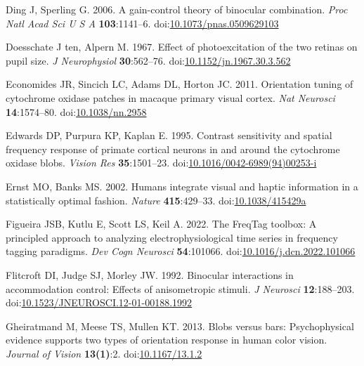 \documentclass[
]{article}
\newlength{\cslhangindent}
\newlength{\cslentryspacingunit} %
\newenvironment{CSLReferences}[2] %
 {%
  \setlength{\parindent}{0pt}
  \ifodd #1
  \let\oldpar\par
  \def\par{\hangindent=\cslhangindent\oldpar}
  \fi
  \setlength{\parskip}{#2\cslentryspacingunit}
 }%
 {}
\begin{document}
\begin{CSLReferences}{1}{0}
\leavevmode{}%
Ding J, Sperling G. 2006. A gain-control theory of binocular combination. \emph{Proc Natl Acad Sci U S A} \textbf{103}:1141--6. doi:\href{https://doi.org/10.1073/pnas.0509629103}{10.1073/pnas.0509629103}

\leavevmode{}%
Doesschate J ten, Alpern M. 1967. Effect of photoexcitation of the two retinas on pupil size. \emph{J Neurophysiol} \textbf{30}:562--76. doi:\href{https://doi.org/10.1152/jn.1967.30.3.562}{10.1152/jn.1967.30.3.562}

\leavevmode{}%
Economides JR, Sincich LC, Adams DL, Horton JC. 2011. Orientation tuning of cytochrome oxidase patches in macaque primary visual cortex. \emph{Nat Neurosci} \textbf{14}:1574--80. doi:\href{https://doi.org/10.1038/nn.2958}{10.1038/nn.2958}

\leavevmode{}%
Edwards DP, Purpura KP, Kaplan E. 1995. Contrast sensitivity and spatial frequency response of primate cortical neurons in and around the cytochrome oxidase blobs. \emph{Vision Res} \textbf{35}:1501--23. doi:\href{https://doi.org/10.1016/0042-6989(94)00253-i}{10.1016/0042-6989(94)00253-i}

\leavevmode{}%
Ernst MO, Banks MS. 2002. Humans integrate visual and haptic information in a statistically optimal fashion. \emph{Nature} \textbf{415}:429--33. doi:\href{https://doi.org/10.1038/415429a}{10.1038/415429a}

\leavevmode{}%
Figueira JSB, Kutlu E, Scott LS, Keil A. 2022. The FreqTag toolbox: A principled approach to analyzing electrophysiological time series in frequency tagging paradigms. \emph{Dev Cogn Neurosci} \textbf{54}:101066. doi:\href{https://doi.org/10.1016/j.dcn.2022.101066}{10.1016/j.dcn.2022.101066}

\leavevmode{}%
Flitcroft DI, Judge SJ, Morley JW. 1992. Binocular interactions in accommodation control: Effects of anisometropic stimuli. \emph{J Neurosci} \textbf{12}:188--203. doi:\href{https://doi.org/10.1523/JNEUROSCI.12-01-00188.1992}{10.1523/JNEUROSCI.12-01-00188.1992}

\leavevmode{}%
Gheiratmand M, Meese TS, Mullen KT. 2013. Blobs versus bars: Psychophysical evidence supports two types of orientation response in human color vision. \emph{Journal of Vision} \textbf{13(1)}:2. doi:\href{https://doi.org/10.1167/13.1.2}{10.1167/13.1.2}


\end{CSLReferences}
\end{document}

